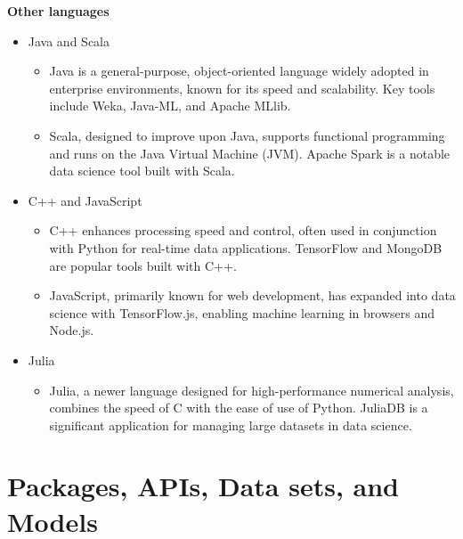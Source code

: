 \documentclass[12pt]{report} %
\begin{document}
	\noindent \textbf{Other languages}
	\begin{itemize}
		\item Java and Scala
			\begin{itemize}
				\item Java is a general-purpose, object-oriented language widely adopted in enterprise environments, known for its speed and scalability. Key tools include Weka, Java-ML, and Apache MLlib.
				\item Scala, designed to improve upon Java, supports functional programming and runs on the Java Virtual Machine (JVM). Apache Spark is a notable data science tool built with Scala.
			\end{itemize}
		\item C++ and JavaScript
		\begin{itemize}
				\item C++ enhances processing speed and control, often used in conjunction with Python for real-time data applications. TensorFlow and MongoDB are popular tools built with C++.
			\item JavaScript, primarily known for web development, has expanded into data science with TensorFlow.js, enabling machine learning in browsers and Node.js.
		\end{itemize}
		\item Julia
			\begin{itemize}
					\item Julia, a newer language designed for high-performance numerical analysis, combines the speed of C with the ease of use of Python. JuliaDB is a significant application for managing large datasets in data science.
			\end{itemize}
	\end{itemize}
	
	
		\section{Packages, APIs, Data sets, and Models}
		
\end{document}
